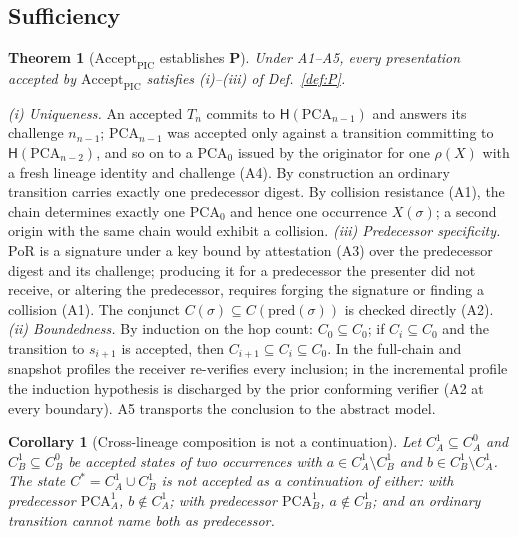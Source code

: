 \documentclass[conference]{IEEEtran}
\newcommand{\Accept}{\mathrm{Accept}}
\newcommand{\PoR}{\mathrm{PoR}}
\newcommand{\Hsh}{\mathsf{H}}
\newtheorem{theorem}{Theorem}
\newtheorem{corollary}{Corollary}
\begin{document}
\subsection{Sufficiency}

\begin{theorem}[$\Accept_{\mathrm{PIC}}$ establishes $\mathbf{P}$]\label{thm:sufficiency}
Under A1--A5, every presentation accepted by $\Accept_{\mathrm{PIC}}$ satisfies (i)--(iii) of Def.~\ref{def:P}.
\end{theorem}

\begin{IEEEproof}
\emph{(i) Uniqueness.} An accepted $T_{n}$ commits to $\Hsh(\mathrm{PCA}_{n-1})$ and answers its challenge $n_{n-1}$; $\mathrm{PCA}_{n-1}$ was accepted only against a transition committing to $\Hsh(\mathrm{PCA}_{n-2})$, and so on to a $\mathrm{PCA}_0$ issued by the originator for one $\rho(X)$ with a fresh lineage identity and challenge (A4). By construction an ordinary transition carries exactly one predecessor digest. By collision resistance (A1), the chain determines exactly one $\mathrm{PCA}_0$ and hence one occurrence $X(\sigma)$; a second origin with the same chain would exhibit a collision. \emph{(iii) Predecessor specificity.} $\PoR$ is a signature under a key bound by attestation (A3) over the predecessor digest and its challenge; producing it for a predecessor the presenter did not receive, or altering the predecessor, requires forging the signature or finding a collision (A1). The conjunct $C(\sigma)\subseteq C(\mathrm{pred}(\sigma))$ is checked directly (A2). \emph{(ii) Boundedness.} By induction on the hop count: $C_0\subseteq C_0$; if $C_i\subseteq C_0$ and the transition to $s_{i+1}$ is accepted, then $C_{i+1}\subseteq C_i\subseteq C_0$. In the full-chain and snapshot profiles the receiver re-verifies every inclusion; in the incremental profile the induction hypothesis is discharged by the prior conforming verifier (A2 at every boundary). A5 transports the conclusion to the abstract model.
\end{IEEEproof}

\begin{corollary}[Cross-lineage composition is not a continuation]\label{cor:mixing}
Let $C_A^1\subseteq C_A^0$ and $C_B^1\subseteq C_B^0$ be accepted states of two occurrences with $a\in C_A^1\setminus C_B^1$ and $b\in C_B^1\setminus C_A^1$. The state $C^\ast=C_A^1\cup C_B^1$ is not accepted as a continuation of either: with predecessor $\mathrm{PCA}_A^1$, $b\notin C_A^1$; with predecessor $\mathrm{PCA}_B^1$, $a\notin C_B^1$; and an ordinary transition cannot name both as predecessor.
\end{corollary}
\end{document}
